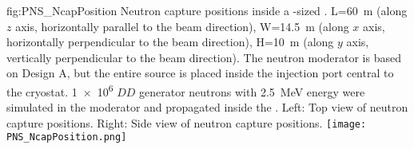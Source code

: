 \begin{dunefigure}{fig:PNS_NcapPosition}
{Neutron capture positions inside a -sized . L=\SI{60}{\m} (along $z$ axis, horizontally parallel to the beam direction), W=\SI{14.5}{\m} (along $x$ axis, horizontally perpendicular to the beam direction), H=\SI{10}{\m} (along $y$ axis, vertically perpendicular to the beam direction). The neutron moderator is based on Design A, but the entire source is placed inside the injection port central to the cryostat. \num{1e6} $DD$ generator neutrons with \SI{2.5}{\MeV} energy were simulated in the moderator and propagated inside the . Left: Top view of neutron capture positions. Right: Side view of neutron capture positions.}
\texttt{[image: PNS\_NcapPosition.png]}
\end{dunefigure}



